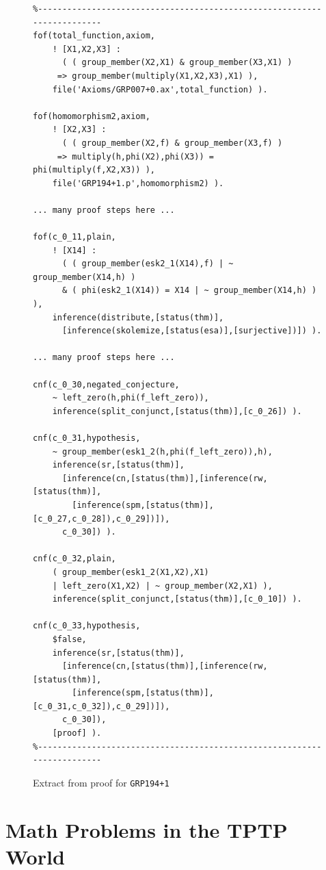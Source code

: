 \documentclass[runningheads]{llncs}
\begin{document}
\begin{figure}[h!]
\centering
{\footnotesize
{\setlength{\baselineskip}{3mm}
\begin{verbatim}
%------------------------------------------------------------------------
fof(total_function,axiom,
    ! [X1,X2,X3] :
      ( ( group_member(X2,X1) & group_member(X3,X1) )
     => group_member(multiply(X1,X2,X3),X1) ),
    file('Axioms/GRP007+0.ax',total_function) ).

fof(homomorphism2,axiom,
    ! [X2,X3] :
      ( ( group_member(X2,f) & group_member(X3,f) )
     => multiply(h,phi(X2),phi(X3)) = phi(multiply(f,X2,X3)) ),
    file('GRP194+1.p',homomorphism2) ).

... many proof steps here ...

fof(c_0_11,plain,
    ! [X14] :
      ( ( group_member(esk2_1(X14),f) | ~ group_member(X14,h) )
      & ( phi(esk2_1(X14)) = X14 | ~ group_member(X14,h) ) ),
    inference(distribute,[status(thm)],
      [inference(skolemize,[status(esa)],[surjective])]) ).

... many proof steps here ...

cnf(c_0_30,negated_conjecture,
    ~ left_zero(h,phi(f_left_zero)),
    inference(split_conjunct,[status(thm)],[c_0_26]) ).

cnf(c_0_31,hypothesis,
    ~ group_member(esk1_2(h,phi(f_left_zero)),h),
    inference(sr,[status(thm)],
      [inference(cn,[status(thm)],[inference(rw,[status(thm)],
        [inference(spm,[status(thm)],[c_0_27,c_0_28]),c_0_29])]),
      c_0_30]) ).

cnf(c_0_32,plain,
    ( group_member(esk1_2(X1,X2),X1)
    | left_zero(X1,X2) | ~ group_member(X2,X1) ),
    inference(split_conjunct,[status(thm)],[c_0_10]) ).

cnf(c_0_33,hypothesis,
    $false,
    inference(sr,[status(thm)],
      [inference(cn,[status(thm)],[inference(rw,[status(thm)],
        [inference(spm,[status(thm)],[c_0_31,c_0_32]),c_0_29])]),
      c_0_30]),
    [proof] ).
%------------------------------------------------------------------------
\end{verbatim}
}}
\caption{Extract from proof for {\tt GRP194+1}}
\label{ExampleDerivationFormulae}
\end{figure}

\section{Math Problems in the TPTP World}
\label{MathProblems}
\end{document}
